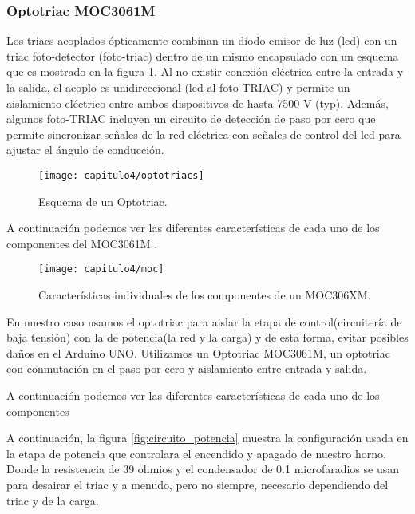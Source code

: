 \subsubsection{Optotriac MOC3061M}
Los triacs acoplados ópticamente combinan un diodo emisor de luz (\acrshort{led}) con un triac foto-detector (foto-triac) dentro de un mismo encapsulado con un esquema que es mostrado en la figura \ref{fig:optotriacs}. Al no existir conexión eléctrica entre la entrada y la salida, el acoplo es unidireccional (\acrshort{led} al foto-TRIAC) y permite un aislamiento eléctrico entre ambos dispositivos de hasta 7500 V (typ). Además, algunos foto-TRIAC incluyen un circuito de detección de paso por cero que permite sincronizar señales de la red eléctrica con señales de control del \acrshort{led} para ajustar el ángulo de conducción. 

\hfill
\begin{figure}[H]%
\noindent \begin{centering}
\texttt{[image: capitulo4/optotriacs]}
\par\end{centering}
\caption{\label{fig:optotriacs} Esquema de un Optotriac.}
\end{figure}
\hfill

A continuación podemos ver las diferentes características de cada uno de los componentes del MOC3061M \cite{moc}.

\hfill
\begin{figure}[H]%
\noindent \begin{centering}
\texttt{[image: capitulo4/moc]}
\par\end{centering}
\caption{\label{fig:moc} Características individuales de los componentes de un MOC306XM.}
\end{figure}
\hfill

En nuestro caso usamos el optotriac para aislar la etapa de control(circuitería de baja tensión) con la de potencia(la red y la carga) y de esta forma, evitar posibles daños en el Arduino UNO. Utilizamos un Optotriac MOC3061M, un optotriac con conmutación en el paso por cero y aislamiento entre entrada y salida. 

A continuación podemos ver las diferentes características de cada uno de los componentes 

A continuación, la figura \ref{fig:circuito_potencia} muestra la configuración usada en la etapa de potencia que controlara el encendido y apagado de nuestro horno. Donde la resistencia de 39 ohmios y el condensador de 0.1 microfaradios se usan para desairar el triac y a menudo, pero no siempre, necesario dependiendo del triac y de la carga.


